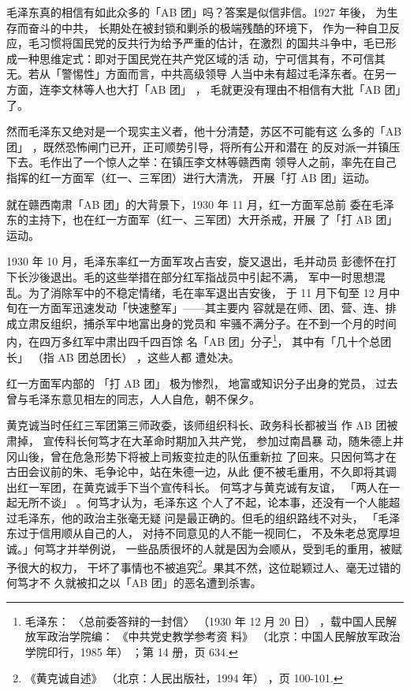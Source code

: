 毛泽东真的相信有如此众多的「AB 团」吗？答案是似信非信。1927
年後，
为生存而奋斗的中共，
长期处在被封锁和剿杀的极端残酷的环境下，
作为一种自卫反应，毛习惯将国民党的反共行为给予严重的估计，在激烈
的国共斗争中，毛已形成一种思维定式：即对于国民党在共产党区域的活
动，宁可信其有，不可信其无。若从「警惕性」方面而言，中共高级领导
人当中未有超过毛泽东者。在另一方面，连李文林等人也大打「AB 团」
，
毛就更没有理由不相信有大批「AB 团」了。

然而毛泽东又绝对是一个现实主义者，他十分清楚，苏区不可能有这
么多的「AB 团」
，既然恐怖闸门已开，正可顺势引导，将所有公开和潜在
的反对派一并镇压下去。毛作出了一个惊人之举：在镇压李文林等赣西南
领导人之前，率先在自己指挥的红一方面军（红一、三军团）进行大清洗，
开展「打 AB 团」运动。

就在赣西南肃「AB 团」的大背景下，1930 年 11 月，红一方面军总前
委在毛泽东的主持下，也在红一方面军（红一、三军团）大开杀戒，开展
了「打 AB 团」运动。

1930 年 10 月，毛泽东率红一方面军攻占吉安，旋又退出，毛并动员
彭德怀在打下长沙後退出。毛的这些举措在部分红军指战员中引起不满，
军中一时思想混乱。为了消除军中的不稳定情绪，毛在率军退出吉安後，
于 11 月下旬至 12 月中旬在一方面军迅速发动「快速整军」——其主要内
容就是在师、团、营、连、排成立肃反组织，捕杀军中地富出身的党员和
牢骚不满分子。在不到一个月的时间内，在四万多红军中肃出四千四百馀
名「AB 团」分子\footnote{ 毛泽东：
〈总前委答辩的一封信〉
（1930 年 12 月 20 日）
，载中国人民解放军政治学院编：
《中共党史教学参考资
料》
（北京：中国人民解放军政治学院印行，1985 年）
；第 14 册，页 634.}， 其中有「几十个总团长」
（指 AB 团总团长）
，这些人都
遭处决。

红一方面军内部的
「打 AB 团」
极为惨烈，
地富或知识分子出身的党员，
过去曾与毛泽东意见相左的同志，人人自危，朝不保夕。

黄克诚当时任红三军团第三师政委，该师组织科长、政务科长都被当
作 AB 团被肃掉，
宣传科长何笃才在大革命时期加入共产党，
参加过南昌暴
动，随朱德上井冈山後，曾在危急形势下将被上司叛变拉走的队伍重新拉
了回来。只因何笃才在古田会议前的朱、毛争论中，站在朱德一边，从此
便不被毛重用，不久即将其调出红一军团，在黄克诚手下当个宣传科长。
何笃才与黄克诚有友谊，
「两人在一起无所不谈」
。何笃才认为，毛泽东这
个人了不起，论本事，还没有一个人能超过毛泽东，他的政治主张毫无疑
问是最正确的。但毛的组织路线不对头，
「毛泽东过于信用顺从自己的人，
对持不同意见的人不能一视同仁，
不及朱老总宽厚坦诚。」何笃才并举例说，
一些品质很坏的人就是因为会顺从，受到毛的重用，被赋予很大的权力，
干坏了事情也不被追究\footnote{ 《黄克诚自述》
（北京：人民出版社，1994 年）
，页 100-101.
}。果其不然，这位聪颖过人、毫无过错的何笃才不
久就被扣之以「AB 团」的恶名遭到杀害。

